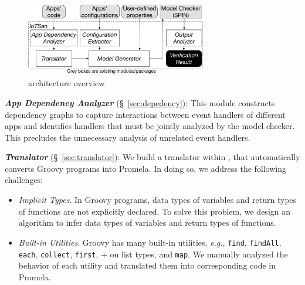 \begin{figure}[tb]
\begin{center}
\includegraphics[width=3.1in]{iSanitizerArchitecture}
\caption{\sys architecture overview.}
\label{iSanitizerArchitecture}
\end{center}
\end{figure}

\textbf{\em App Dependency Analyzer} (\S~\ref{sec:depedency}):
This module constructs dependency graphs to capture
interactions between {\color{black}event handlers of different apps
and identifies handlers that must be jointly analyzed by the model checker.
This precludes the unnecessary analysis of unrelated event handlers.}

\textbf{\em Translator} (\S~\ref{sec:translator}):
We build a translator within \sys, that automatically converts Groovy programs into Promela.
In doing so, we address the following challenges:
\begin{itemize}
\item {\em Implicit Types}. In Groovy programs, data types of variables and return types of functions are not
explicitly declared. To solve this problem, we design an algorithm to infer data types of variables and return types of functions.
\item {\em Built-in Utilities}. Groovy has many built-in utilities,
\textit{e.g.}, \texttt{find}, \texttt{findAll}, \texttt{each}, \texttt{collect},
\texttt{first}, $+$ on list types, and \texttt{map}.
We manually analyzed the behavior of each utility and translated them into corresponding code in Promela.
\end{itemize}

